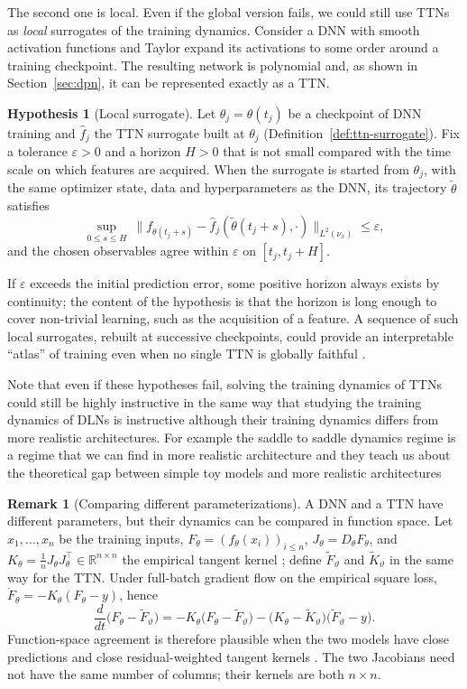 \documentclass[11pt]{article}
\newcommand{\R}{\mathbb{R}}
\newcommand{\norm}[1]{\lVert #1\rVert}
\newcommand{\fhat}{\hat f}
\theoremstyle{definition}
\newtheorem{remark}[theorem]{Remark}
\newtheorem{hypothesis}[theorem]{Hypothesis}
\numberwithin{equation}{section}
\begin{document}
The second one is local. Even if the global version fails, we could still use TTNs as \emph{local} surrogates of the training dynamics. Consider a DNN with smooth activation functions and Taylor expand its activations to some order around a training checkpoint. The resulting network is polynomial and, as shown in Section~\ref{sec:dpn}, it can be represented exactly as a TTN.

\begin{hypothesis}[Local surrogate]\label{hyp:local}
Let $\theta_j=\theta(t_j)$ be a checkpoint of DNN training and $\fhat_j$ the TTN surrogate built at $\theta_j$ (Definition~\ref{def:ttn-surrogate}). Fix a tolerance $\varepsilon>0$ and a horizon $H>0$ that is not small compared with the time scale on which features are acquired. When the surrogate is started from $\theta_j$, with the same optimizer state, data and hyperparameters as the DNN, its trajectory $\tilde\theta$ satisfies
\[
\sup_{0\le s\le H}\ \norm{f_{\theta(t_j+s)}-\fhat_j(\tilde\theta(t_j+s),\cdot)}_{L^2(\nu_x)}\le\varepsilon,
\]
and the chosen observables agree within $\varepsilon$ on $[t_j,t_j+H]$.
\end{hypothesis}

If $\varepsilon$ exceeds the initial prediction error, some positive horizon always exists by continuity; the content of the hypothesis is that the horizon is long enough to cover non-trivial learning, such as the acquisition of a feature. A sequence of such local surrogates, rebuilt at successive checkpoints, could provide an interpretable ``atlas'' of training even when no single TTN is globally faithful \citep{hfl_surrogate}.

Note that even if these hypotheses fail, solving the training dynamics of TTNs could still be highly instructive in the same way that studying the training dynamics of DLNs is instructive although their training dynamics differs from more realistic architectures. For example the saddle to saddle dynamics regime is a regime that we can find in more realistic architecture and they teach us about the theoretical gap between simple toy models and more realistic architectures
\begin{remark}[Comparing different parameterizations]\label{rem:kernel}
A DNN and a TTN have different parameters, but their dynamics can be compared in function space. Let $x_1,\dots,x_n$ be the training inputs, $F_\theta=(f_\theta(x_i))_{i\le n}$, $J_\theta=D_\theta F_\theta$, and $K_\theta=\frac1n J_\theta J_\theta^\top\in\R^{n\times n}$ the empirical tangent kernel \citep{jacot2018neural}; define $\tilde F_\vartheta$ and $\tilde K_\vartheta$ in the same way for the TTN. Under full-batch gradient flow on the empirical square loss, $\dot F_\theta=-K_\theta(F_\theta-y)$, hence
\[
\frac{d}{dt}\big(F_\theta-\tilde F_\vartheta\big)=-K_\theta\big(F_\theta-\tilde F_\vartheta\big)-\big(K_\theta-\tilde K_\vartheta\big)\big(\tilde F_\vartheta-y\big).
\]
Function-space agreement is therefore plausible when the two models have close predictions and close residual-weighted tangent kernels \citep[Section~4.3]{hfl_surrogate}. The two Jacobians need not have the same number of columns; their kernels are both $n\times n$.
\end{remark}
\end{document}
